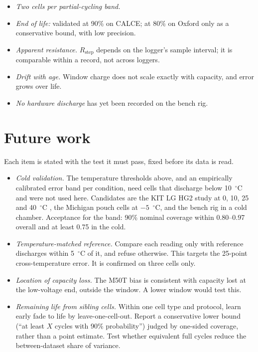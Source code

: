 \documentclass[preprint,12pt,authoryear]{elsarticle}
\begin{document}
\begin{itemize}
RUL.
\item \emph{Two cells per partial-cycling band.}
\item \emph{End of life:} validated at 90\% on CALCE; at 80\% on Oxford only
as a conservative bound, with low precision.
\item \emph{Apparent resistance.} $R_\mathrm{step}$ depends on the logger's
sample interval; it is comparable within a record, not across loggers.
\item \emph{Drift with age.} Window charge does not scale exactly with capacity,
and error grows over life.
\item \emph{No hardware discharge} has yet been recorded on the bench rig.
\end{itemize}

\section{Future work}
\label{sec:future}

Each item is stated with the test it must pass, fixed before its data is read.
\begin{itemize}
\item \emph{Cold validation.} The temperature thresholds above, and an empirically
calibrated error band per condition, need cells that discharge below
10~$^\circ$C and were not used here. Candidates are the KIT LG HG2 study at 0,
10, 25 and 40~$^\circ$C \citep{luh2024}, the Michigan pouch cells at
$-5$~$^\circ$C, and the bench rig in a cold chamber. Acceptance for the band: 90\%
nominal coverage within 0.80--0.97 overall and at least 0.75 in the cold.
\item \emph{Temperature-matched reference.} Compare each reading only with
reference discharges within 5~$^\circ$C of it, and refuse otherwise. This
targets the 25-point cross-temperature error. It is confirmed on three cells
only.
\item \emph{Location of capacity loss.} The M50T bias is consistent with capacity
lost at the low-voltage end, outside the window. A lower window would test this.
\item \emph{Remaining life from sibling cells.} Within one cell type and protocol,
learn early fade to life by leave-one-cell-out. Report a conservative lower bound
(``at least $X$ cycles with 90\% probability'') judged by one-sided coverage,
rather than a point estimate. Test whether equivalent full cycles reduce the
between-dataset share of variance.
\end{itemize}
\end{document}
